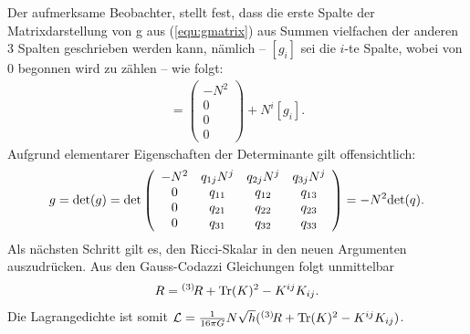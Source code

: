 \documentclass{scrartcl}
\newcommand{\inHS}{{}^{(3)}\!}
\begin{document}
		Der aufmerksame Beobachter, stellt fest, dass die erste Spalte der Matrixdarstellung von g aus (\ref{equ:gmatrix}) aus 
		Summen vielfachen der anderen 3 Spalten geschrieben werden kann, nämlich -- $[g_i]$ sei die $i$-te Spalte, wobei von
		0 begonnen wird zu zählen -- wie folgt:
		\begin{align}
			[g_0]=\left(\begin{array}{c}-N^2\\0\\0\\0\end{array}\right)+N^i[g_i].
		\end{align}
		Aufgrund elementarer Eigenschaften der Determinante gilt offensichtlich:
		\begin{align}
			g={\rm det}(g)={\rm det}\left(
			\begin{array}{cccc}
				-N^2 & q_{1j}N^j & q_{2j}N^j & q_{3j}N^j \\
				0 & q_{11} & q_{12} & q_{13}\\
				0 & q_{21} & q_{22} & q_{23}\\
				0 & q_{31} & q_{32} & q_{33}
			\end{array}\right)=-N^2 {\rm det}(q).
		\end{align}
		Als nächsten Schritt gilt es, den Ricci-Skalar in den neuen Argumenten auszudrücken. Aus den Gauss-Codazzi Gleichungen folgt unmittelbar
		\begin{align*}
			R=\inHS R+{\rm Tr}(K)^2-K^{ij}K_{ij}.
		\end{align*}
		Die Lagrangedichte ist somit $\mathcal{L}=\frac{1}{16\pi G} N\sqrt{h}(\inHS R+{\rm Tr}(K)^2-K^{ij}K_{ij})$. 
		
\end{document}
